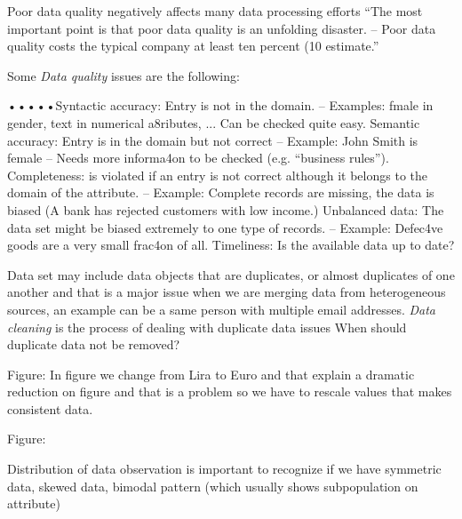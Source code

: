  Poor data quality negatively affects many data processing efforts
“The most important point is that poor data quality is an unfolding
disaster.
– Poor data quality costs the typical company at least ten percent
(10%
estimate.”

Some \emph{Data quality} issues are the following:
\begin{description}
•••••Syntactic accuracy: Entry is not in the domain.
– Examples: fmale in gender, text in numerical a8ributes, ... Can be
checked quite easy.
Semantic accuracy: Entry is in the domain but not correct
– Example: John Smith is female
– Needs more informa4on to be checked (e.g. “business rules”).
Completeness: is violated if an entry is not correct although
it belongs to the domain of the attribute.
– Example: Complete records are missing, the data is biased (A bank has
rejected customers with low income.)
Unbalanced data: The data set might be biased extremely
to one type of records.
– Example: Defec4ve goods are a very small frac4on of all.
Timeliness: Is the available data up to date?
\end{description}
Data set may include data objects that are duplicates, or almost duplicates of one another and that is 
a major issue when we are merging data from heterogeneous sources, an example can be a same person with
multiple email addresses.
\emph{Data cleaning} is the process of dealing with duplicate data issues 
When should duplicate data not be removed?

Figure: In figure we change from Lira to Euro and that explain a dramatic reduction on figure and that is 
a problem so we have to rescale values that makes consistent data.

Figure: 

Distribution of data observation is important to recognize if we have symmetric data, skewed data, bimodal
pattern (which usually shows subpopulation on attribute)

